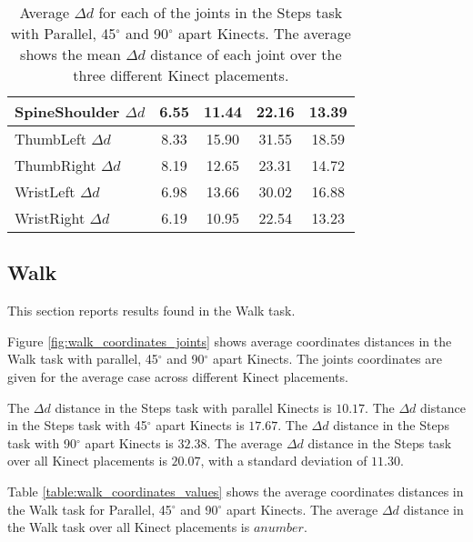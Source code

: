 \begin{table}[!htb]
\begin{tabularx}{1.0\columnwidth}{||X c c c c||}
 \hline
 SpineShoulder $\Delta d$ & 6.55 & 11.44 & 22.16 & 13.39 \\
 \hline
 ThumbLeft $\Delta d$ & 8.33 & 15.90 & 31.55 & 18.59 \\
 \hline
 ThumbRight $\Delta d$ & 8.19 & 12.65 & 23.31 & 14.72 \\
 \hline
 WristLeft $\Delta d$ & 6.98 & 13.66 & 30.02 & 16.88 \\
 \hline
 WristRight $\Delta d$ & 6.19 & 10.95 & 22.54 & 13.23 \\
 \hline
\end{tabularx}
\caption{Average $\Delta d$ for each of the joints in the Steps task with Parallel, 45$^{\circ}$ and 90$^{\circ}$ apart Kinects. The average shows the mean $\Delta d$ distance of each joint over the three different Kinect placements.}
\label{table:steps_joints_values}
\end{table}

% 
% 
\FloatBarrier
\subsection{Walk}
This section reports results found in the Walk task.

Figure \ref{fig:walk_coordinates_joints} shows average coordinates distances in the Walk task with parallel, 45$^{\circ}$ and 90$^{\circ}$ apart Kinects. The joints coordinates are given for the average case across different Kinect placements.

The $\Delta d$ distance in the Steps task with parallel Kinects is $10.17$. The $\Delta d$ distance in the Steps task with 45$^{\circ}$ apart Kinects is $17.67$. The $\Delta d$ distance in the Steps task with 90$^{\circ}$ apart Kinects is $32.38$. The average $\Delta d$ distance in the Steps task over all Kinect placements is $20.07$, with a standard deviation of $11.30$.

\begin{figure*}[!htb]
  \centering

  
  

  \caption{Average coordinates distances in the Walk task with Parallel, 45$^{\circ}$ and 90$^{\circ}$ apart Kinects. The joints distances are also given for the average case.}

  \label{fig:walk_coordinates_joints}
\end{figure*}

Table \ref{table:walk_coordinates_values} shows the average coordinates distances in the Walk task for Parallel, 45$^{\circ}$ and 90$^{\circ}$ apart Kinects. The average $\Delta d$ distance in the Walk task over all Kinect placements is $a number$.

